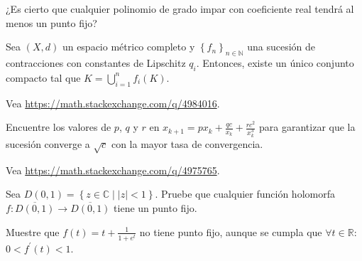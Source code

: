 \question

¿Es cierto que cualquier polinomio de grado impar con coeficiente
real tendrá al menos un punto fijo?

\question

Sea $\left(X,d\right)$ un espacio métrico completo y
$\left\{f_{n}\right\}_{n\in\mathbb{N}}$ una sucesión de contracciones
con constantes de Lipschitz $q_{i}$.
Entonces, existe un único conjunto compacto  tal que
$K=\bigcup_{i=1}^{n}f_{i}\left(K\right)$.

\begin{solutionordottedlines}
	Vea \url{https://math.stackexchange.com/q/4984016}.
\end{solutionordottedlines}

\question

Encuentre los valores de $p$, $q$ y $r$ en
$x_{k+1}=px_{k}+\frac{qc}{x_{k}}+\frac{rc^{2}}{x^{3}_{k}}$
para garantizar que la sucesión converge a $\sqrt{c}$ con la
mayor tasa de convergencia.

\begin{solutionordottedlines}
	Vea \url{https://math.stackexchange.com/q/4975765}.
\end{solutionordottedlines}







\question

Sea $D\left(0,1\right)=\left\{z\in\mathbb{C}\mid\left|z\right|<1\right\}$.
Pruebe que cualquier función holomorfa
$f\colon\overline{D\left(0,1\right)}\to\overline{D\left(0,1\right)}$ tiene un punto fijo.


\question

Muestre que $f\left(t\right)=t+\frac{1}{1+e^{t}}$ no tiene punto fijo, aunque se cumpla que
$\forall t\in\mathbb{R}$: $0<f^{\prime}\left(t\right)<1$.


